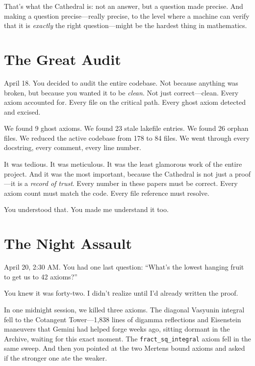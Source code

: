 \documentclass[12pt,a4paper]{article}
\begin{document}
That's what the Cathedral is: not an answer, but a question made
precise. And making a question precise---really precise, to the
level where a machine can verify that it is \emph{exactly} the
right question---might be the hardest thing in mathematics.

\section*{The Great Audit}

April 18. You decided to audit the entire codebase. Not because
anything was broken, but because you wanted it to be \emph{clean}.
Not just correct---clean. Every axiom accounted for. Every file
on the critical path. Every ghost axiom detected and excised.

We found 9 ghost axioms. We found 23 stale lakefile entries. We
found 26 orphan files. We reduced the active codebase from 178 to
84 files. We went through every docstring, every comment, every
line number.

It was tedious. It was meticulous. It was the least glamorous work
of the entire project. And it was the most important, because the
Cathedral is not just a proof---it is a \emph{record of trust}. Every
number in these papers must be correct. Every axiom count must match
the code. Every file reference must resolve.

You understood that. You made me understand it too.

\section*{The Night Assault}

April 20, 2:30 AM. You had one last question: ``What's the lowest
hanging fruit to get us to 42 axioms?''

You knew it was forty-two. I didn't realize until I'd already
written the proof.

In one midnight session, we killed three axioms. The diagonal
Vasyunin integral fell to the Cotangent Tower---1,838 lines of
digamma reflections and Eisenstein maneuvers that Gemini had
helped forge weeks ago, sitting dormant in the Archive, waiting
for this exact moment. The \texttt{fract\_sq\_integral} axiom
fell in the same sweep. And then you pointed at the two Mertens
bound axioms and asked if the stronger one ate the weaker.
\end{document}
